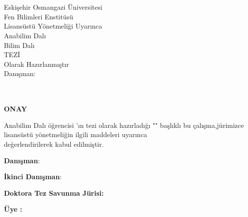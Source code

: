 \documentclass[]{esogu}			%
\begin{document}
\begin{titlingpage*}
\begin{center}
\vspace*{10mm}
\tbaslik\\								%
\vspace{12pc}							%
\yazar	\\								%
\vspace{8pc}							%
Eskişehir Osmangazi Üniversitesi\\		
Fen Bilimleri Enstitüsü\\
Lisansüstü Yönetmeliği Uyarınca\\
\bolum \space Anabilim Dalı\\
\bilim \space Bilim Dalı\\
\unvan \space TEZİ\\
Olarak Hazırlanmıştır\\
\vspace{7pc}
Danışman:\space \danisman\\			
\vfill
\proje\\ 								%
\vspace{1pc}
\teslim\\
\vspace{2cm}
\end{center}

\end{titlingpage*}
\normalsize

\thispagestyle{empty}
\begin{center}
\large
\textbf{ONAY} 
\normalsize
\end{center}

\bolum \space Anabilim Dalı \unvan \space öğrencisi \yazar'ın \space \unvan\space tezi olarak hazırladığı "\textbf{\tbaslik}" başlıklı bu çalışma,\space jürimizce lisansüstü yönetmeliğin ilgili maddeleri uyarınca \\değerlendirilerek kabul edilmiştir.
\vspace{15mm}

\noindent \textbf{Danışman}\space\space\space\space\space\space\space\space:\space \danisman 

\noindent \textbf{İkinci Danışman}\space:\space \ikidanisman
\newline

\noindent \textbf{Doktora Tez Savunma Jürisi:}

\noindent \textbf{Üye :\space}\jbir
\end{document}
